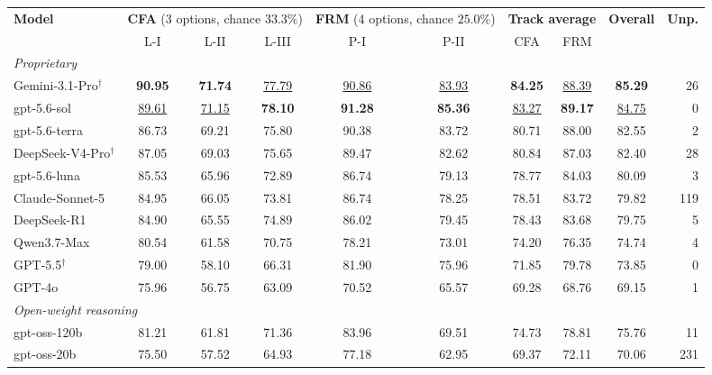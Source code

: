 \begin{table}[t]
\centering\small
\setlength{\tabcolsep}{4pt}
\begin{tabular}{l ccc cc cc c r}
\toprule
\multirow{2}{*}{\textbf{Model}} & \multicolumn{3}{c}{\textbf{CFA} (3 options, chance $33.3\%$)} & \multicolumn{2}{c}{\textbf{FRM} (4 options, chance $25.0\%$)} & \multicolumn{2}{c}{\textbf{Track average}} & \multirow{2}{*}{\textbf{Overall}} & \multirow{2}{*}{\textbf{Unp.}} \\
\cmidrule(lr){2-4} \cmidrule(lr){5-6} \cmidrule(lr){7-8}
 & L-I & L-II & L-III & P-I & P-II & CFA & FRM & & \\
\midrule
\multicolumn{10}{l}{\textit{Proprietary}} \\
Gemini-3.1-Pro$^{\dagger}$ & \textbf{90.95} & \textbf{71.74} & \underline{77.79} & \underline{90.86} & \underline{83.93} & \textbf{84.25} & \underline{88.39} & \textbf{85.29} & 26 \\
gpt-5.6-sol & \underline{89.61} & \underline{71.15} & \textbf{78.10} & \textbf{91.28} & \textbf{85.36} & \underline{83.27} & \textbf{89.17} & \underline{84.75} & 0 \\
gpt-5.6-terra & 86.73 & 69.21 & 75.80 & 90.38 & 83.72 & 80.71 & 88.00 & 82.55 & 2 \\
DeepSeek-V4-Pro$^{\dagger}$ & 87.05 & 69.03 & 75.65 & 89.47 & 82.62 & 80.84 & 87.03 & 82.40 & 28 \\
gpt-5.6-luna & 85.53 & 65.96 & 72.89 & 86.74 & 79.13 & 78.77 & 84.03 & 80.09 & 3 \\
Claude-Sonnet-5 & 84.95 & 66.05 & 73.81 & 86.74 & 78.25 & 78.51 & 83.72 & 79.82 & 119 \\
DeepSeek-R1 & 84.90 & 65.55 & 74.89 & 86.02 & 79.45 & 78.43 & 83.68 & 79.75 & 5 \\
Qwen3.7-Max & 80.54 & 61.58 & 70.75 & 78.21 & 73.01 & 74.20 & 76.35 & 74.74 & 4 \\
GPT-5.5$^{\dagger}$ & 79.00 & 58.10 & 66.31 & 81.90 & 75.96 & 71.85 & 79.78 & 73.85 & 0 \\
GPT-4o & 75.96 & 56.75 & 63.09 & 70.52 & 65.57 & 69.28 & 68.76 & 69.15 & 1 \\
\midrule
\multicolumn{10}{l}{\textit{Open-weight reasoning}} \\
gpt-oss-120b & 81.21 & 61.81 & 71.36 & 83.96 & 69.51 & 74.73 & 78.81 & 75.76 & 11 \\
gpt-oss-20b & 75.50 & 57.52 & 64.93 & 77.18 & 62.95 & 69.37 & 72.11 & 70.06 & 231 \\

\end{tabular}
\end{table}
